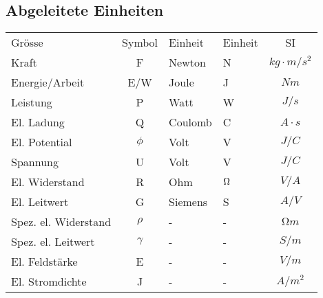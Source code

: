 \begin{sectionbox}
	\subsection{Abgeleitete Einheiten}
		\begin{emphbox}
			\begin{tabular}{lcllc}
				Grösse & Symbol & Einheit & Einheit & SI \\
				Kraft & F & Newton & N & $kg\cdot m/s^2$ \\
				Energie/Arbeit & E/W & Joule & J & $Nm$ \\
				Leistung & P & Watt & W & $J/s$ \\
				El. Ladung & Q & Coulomb & C & $A \cdot s$ \\
				El. Potential & $\phi$ & Volt & V & $J/C$ \\
				Spannung & U & Volt & V & $J/C$ \\
				El. Widerstand & R & Ohm & $\ohm$ & $V/A$ \\
				El. Leitwert & G & Siemens & S & $A/V$ \\
				Spez. el. Widerstand & $\rho$ & - & - & $Ωm$ \\
				Spez. el. Leitwert & $\gamma$ & - & - & $S/m$ \\
				El. Feldstärke & E & - & - & $V/m$ \\
				El. Stromdichte & J & - & - & $A/m^2$ \\
			\end{tabular}
		\end{emphbox}
	
\end{sectionbox}
